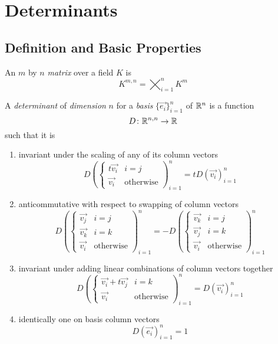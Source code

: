 \documentclass[notes.tex]{subfiles}
\begin{document}
\setcounter{section}{4}
\section{Determinants}
\subsection{Definition and Basic Properties}
\begin{definition}[Matrix]
    An $m$ by $n$ \textit{matrix} over a field $K$ is
    \[
        K^{m, n} = \bigtimes_{i = 1}^n K^m
    \]
\end{definition}

\begin{definition}[Determinant]
    A \textit{determinant} of \textit{dimension} $n$ for a \textit{basis} $\{ \vec{e_i} \}_{i = 1}^n$ of $\mathbb{R}^n$ is a function
    \[
        D\colon \mathbb{R}^{n, n} \to \mathbb{R}
    \]
    such that it is
    \begin{enumerate}[label = (\arabic*)]
        \item invariant under the scaling of any of its column vectors
        \[
            D\left(\begin{cases} 
                t\vec{v_i} & i = j \\
                \vec{v_i} & \text{otherwise}
            \end{cases}
            \right)_{i = 1}^n = tD(\vec{v_i})_{i = 1}^n
        \]
        \item anticommutative with respect to swapping of column vectors
        \[
            D\left(\begin{cases}
                \vec{v_j} & i = j \\
                \vec{v_k} & i = k \\
                \vec{v_i} & \text{otherwise}
            \end{cases}\right)_{i = 1}^n
            =
            -D\left(\begin{cases}
                \vec{v_k} & i = j \\
                \vec{v_j} & i = k \\
                \vec{v_i} & \text{otherwise}
            \end{cases}\right)_{i = 1}^n
        \]
        \item invariant under adding linear combinations of column vectors together
        \[
            D\left(\begin{cases}
                \vec{v_i} + t\vec{v_j} & i = k \\
                \vec{v_i} & \text{otherwise}
            \end{cases}\right)_{i = 1}^n = D(\vec{v_i})_{i = 1}^n
        \]
        \item identically one on basis column vectors
        \[
            D(\vec{e_i})_{i = 1}^n = 1
        \]
    \end{enumerate}
\end{definition}
\end{document}
